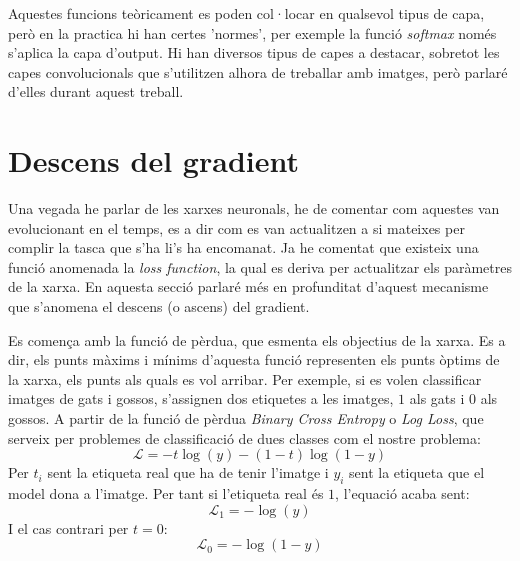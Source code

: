 Aquestes funcions teòricament es poden col·locar en qualsevol tipus de capa, però en la practica hi han certes 'normes', per exemple la funció \textit{softmax} només s'aplica la capa d'output. Hi han diversos tipus de capes a destacar, sobretot les capes convolucionals que s'utilitzen alhora de treballar amb imatges, però parlaré d'elles durant aquest treball.

\section{Descens del gradient}
Una vegada he parlar de les xarxes neuronals, he de comentar com aquestes van evolucionant en el temps, es a dir com es van actualitzen a si mateixes per complir la tasca que s'ha li's ha encomanat. Ja he comentat que existeix una funció anomenada la \textit{loss function}, la qual es deriva per actualitzar els paràmetres de la xarxa. En aquesta secció parlaré més en profunditat d'aquest mecanisme que s'anomena el descens (o ascens) del gradient.

Es comença amb la funció de pèrdua, que esmenta els objectius de la xarxa. Es a dir, els punts màxims i mínims d'aquesta funció representen els punts òptims de la xarxa, els punts als quals es vol arribar. Per exemple, si es volen classificar imatges de gats i gossos, s'assignen dos etiquetes a les imatges, $1$ als gats i $0$ als gossos. A partir de la funció de pèrdua \textit{Binary Cross Entropy} o \textit{Log Loss}, que serveix per problemes de classificació de dues classes com el nostre problema:
\begin{equation}
	\mathcal{L} = - t\log(y) - (1 - t)\log(1 - y) 
	\label{eq:BCE}
\end{equation}
Per $t_i$ sent la etiqueta real que ha de tenir l'imatge i $y_i$ sent la etiqueta que el model dona a l'imatge. Per tant si l'etiqueta real és $1$, l'equació acaba sent:
$$
\mathcal{L}_1 = - \log(y)
$$
I el cas contrari per $t = 0$:
$$
\mathcal{L}_0 = - \log(1 - y)
$$


